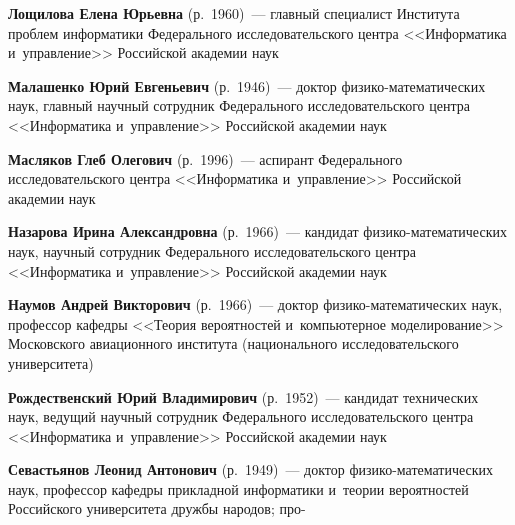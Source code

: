 \begin{multicols}{2}
\noindent
\textbf{Лощилова Елена Юрьевна} (р.\ 1960)~--- главный специалист Института проб\-лем 
информатики Федерального исследовательского цент\-ра <<Информатика и~управ\-ле\-ние>> 
Российской академии наук

\vspace*{2pt}

\noindent
\textbf{Малашенко Юрий Евгеньевич} (р.\ 1946)~--- доктор фи\-зи\-ко-ма\-те\-ма\-ти\-че\-ских наук, 
главный научный со\-труд\-ник Федерального исследовательского цент\-ра <<Информатика и~управ\-ле\-ние>>
 Российской академии наук
 
  \vspace*{2pt}
 
 \noindent
\textbf{Масляков Глеб Олегович} (р.\ 1996)~--- 
аспирант Федерального исследовательского центра <<Информатика и~управ\-ле\-ние>> 
Российской академии наук
 
 \vspace*{2pt}
 
 \noindent
\textbf{Назарова Ирина Александровна} (р.\ 1966)~--- кандидат фи\-зи\-ко-ма\-те\-ма\-ти\-че\-ских наук, 
научный  со\-труд\-ник Федерального исследовательского цент\-ра <<Информатика и~управ\-ле\-ние>> Российской 
академии наук

\vspace*{2pt}

\noindent
\textbf{Наумов Андрей Викторович} (р.\ 1966)~--- доктор фи\-зи\-ко-ма\-те\-ма\-ти\-че\-ских наук, 
профессор кафедры <<Тео\-рия вероятностей и~компьютерное моделирование>>
 Московского авиационного института (национального исследовательского университета)
 
 \vspace*{2pt}
 
 \noindent
\textbf{Рождественский Юрий Владимирович} (р.\ 1952)~--- 
кандидат технических наук, ведущий научный сотрудник Федерального исследовательского цент\-ра 
<<Информатика и~управ\-ле\-ние>> Российской академии наук
 
 \vspace*{2pt}
 
 \noindent
\textbf{Севастьянов Леонид Антонович} (р.\ 1949)~--- 
доктор фи\-зи\-ко-ма\-те\-ма\-ти\-че\-ских наук, профессор ка\-фед\-ры 
при\-клад\-ной информатики и~тео\-рии вероятностей Российского университета друж\-бы народов; 
про-\linebreak\vspace*{-12pt}

\columnbreak


\end{multicols}
